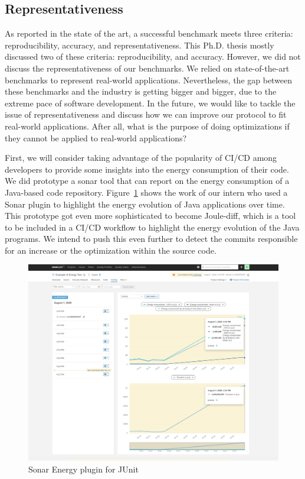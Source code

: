 \subsection*{Representativeness}
As reported in the state of the art, a successful benchmark meets three criteria: reproducibility, accuracy, and representativeness.
This Ph.D. thesis mostly discussed two of these criteria: reproducibility, and accuracy.
However, we did not discuss the representativeness of our benchmarks.
We relied on state-of-the-art benchmarks to represent real-world applications.
Nevertheless, the gap between these benchmarks and the industry is getting bigger and bigger, due to the extreme pace of software development.
In the future, we would like to tackle the issue of representativeness and discuss how we can improve our protocol to fit real-world applications.
After all, what is the purpose of doing optimizations if they cannot be applied to real-world applications?

First, we will consider taking advantage of the popularity of CI/CD among developers to provide some insights into the energy consumption of their code.
We did prototype a sonar tool that can report on the energy consumption of a Java-based code repository.
Figure~\ref{fig:JunitSonarplugin} shows the work of our intern who used a Sonar plugin to highlight the energy evolution of Java applications over time.
This prototype got even more sophisticated to become Joule-diff, which is a tool to be included in a CI/CD workflow to highlight the energy evolution of the Java programs.
We intend to push this even further to detect the commits responsible for an increase or the optimization within the source code.

\begin{figure}[!h]
      \centering
      \includegraphics[width=.8\linewidth]{chapters/JunitSonarplugin}
      \caption{Sonar Energy plugin for JUnit}
      \label{fig:JunitSonarplugin}
\end{figure}


